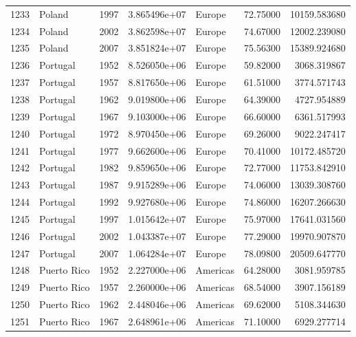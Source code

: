 \documentclass[
  letterpaper,
  DIV=11,
  numbers=noendperiod]{scrreprt}
\begin{document}
\begin{tabular}{llrrlrr}
1233 &                    Poland &  1997 &  3.865496e+07 &    Europe &  72.75000 &   10159.583680 \\
1234 &                    Poland &  2002 &  3.862598e+07 &    Europe &  74.67000 &   12002.239080 \\
1235 &                    Poland &  2007 &  3.851824e+07 &    Europe &  75.56300 &   15389.924680 \\
1236 &                  Portugal &  1952 &  8.526050e+06 &    Europe &  59.82000 &    3068.319867 \\
1237 &                  Portugal &  1957 &  8.817650e+06 &    Europe &  61.51000 &    3774.571743 \\
1238 &                  Portugal &  1962 &  9.019800e+06 &    Europe &  64.39000 &    4727.954889 \\
1239 &                  Portugal &  1967 &  9.103000e+06 &    Europe &  66.60000 &    6361.517993 \\
1240 &                  Portugal &  1972 &  8.970450e+06 &    Europe &  69.26000 &    9022.247417 \\
1241 &                  Portugal &  1977 &  9.662600e+06 &    Europe &  70.41000 &   10172.485720 \\
1242 &                  Portugal &  1982 &  9.859650e+06 &    Europe &  72.77000 &   11753.842910 \\
1243 &                  Portugal &  1987 &  9.915289e+06 &    Europe &  74.06000 &   13039.308760 \\
1244 &                  Portugal &  1992 &  9.927680e+06 &    Europe &  74.86000 &   16207.266630 \\
1245 &                  Portugal &  1997 &  1.015642e+07 &    Europe &  75.97000 &   17641.031560 \\
1246 &                  Portugal &  2002 &  1.043387e+07 &    Europe &  77.29000 &   19970.907870 \\
1247 &                  Portugal &  2007 &  1.064284e+07 &    Europe &  78.09800 &   20509.647770 \\
1248 &               Puerto Rico &  1952 &  2.227000e+06 &  Americas &  64.28000 &    3081.959785 \\
1249 &               Puerto Rico &  1957 &  2.260000e+06 &  Americas &  68.54000 &    3907.156189 \\
1250 &               Puerto Rico &  1962 &  2.448046e+06 &  Americas &  69.62000 &    5108.344630 \\
1251 &               Puerto Rico &  1967 &  2.648961e+06 &  Americas &  71.10000 &    6929.277714 \\

\end{tabular}
\end{document}
